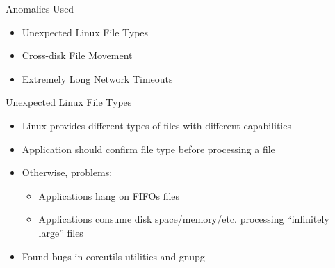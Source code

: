 \documentclass[pdf]{beamer}
\begin{document}
\begin{frame}{Anomalies Used}
  \begin{itemize}
  \item{Unexpected Linux File Types}
  \item{Cross-disk File Movement}
  \item{Extremely Long Network Timeouts}
  \end{itemize}
\end{frame}


\begin{frame}{Unexpected Linux File Types}
  \begin{itemize}
  \item{Linux provides different types of files with different capabilities}
  \item{Application should confirm file type before processing a file}
  \item{Otherwise, problems:}
    \begin{itemize}
    \item{Applications hang on FIFOs files}
    \item{Applications consume disk space/memory/etc. processing ``infinitely
        large'' files}
    \end{itemize}
  \item{Found bugs in coreutils utilities and gnupg}
  \end{itemize}
\end{frame}
\end{document}
